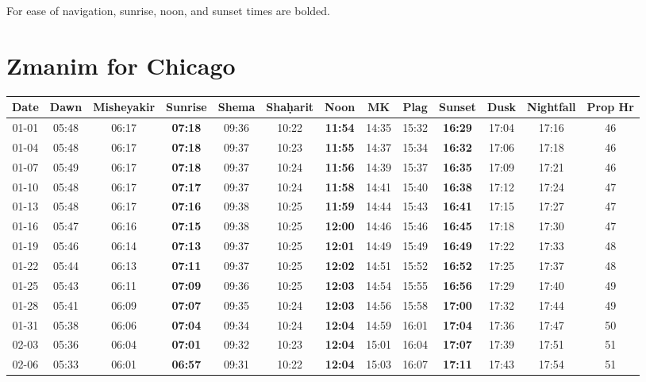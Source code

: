For ease of navigation, sunrise, noon, and sunset times are bolded.

\newpage
\section{Zmanim for Chicago }
\vspace{-0.5\baselineskip}
\begin{footnotesize}
	\begin{longtable}{c | c | c | c | c | c | c | c | c | c | c | c | c}
		Date&Dawn&Misheyakir&Sunrise&Shema&Sha\d{h}arit&Noon&MK&Plag&Sunset&Dusk&Nightfall&Prop Hr\\\hline\endhead
		01-01&05:48&06:17&\textbf{07:18}&09:36&10:22&\textbf{11:54}&14:35&15:32&\textbf{16:29}&17:04&17:16&46\\\hline
		01-04&05:48&06:17&\textbf{07:18}&09:37&10:23&\textbf{11:55}&14:37&15:34&\textbf{16:32}&17:06&17:18&46\\\hline
		01-07&05:49&06:17&\textbf{07:18}&09:37&10:24&\textbf{11:56}&14:39&15:37&\textbf{16:35}&17:09&17:21&46\\\hline
		01-10&05:48&06:17&\textbf{07:17}&09:37&10:24&\textbf{11:58}&14:41&15:40&\textbf{16:38}&17:12&17:24&47\\\hline
		01-13&05:48&06:17&\textbf{07:16}&09:38&10:25&\textbf{11:59}&14:44&15:43&\textbf{16:41}&17:15&17:27&47\\\hline
		01-16&05:47&06:16&\textbf{07:15}&09:38&10:25&\textbf{12:00}&14:46&15:46&\textbf{16:45}&17:18&17:30&47\\\hline
		01-19&05:46&06:14&\textbf{07:13}&09:37&10:25&\textbf{12:01}&14:49&15:49&\textbf{16:49}&17:22&17:33&48\\\hline
		01-22&05:44&06:13&\textbf{07:11}&09:37&10:25&\textbf{12:02}&14:51&15:52&\textbf{16:52}&17:25&17:37&48\\\hline
		01-25&05:43&06:11&\textbf{07:09}&09:36&10:25&\textbf{12:03}&14:54&15:55&\textbf{16:56}&17:29&17:40&49\\\hline
		01-28&05:41&06:09&\textbf{07:07}&09:35&10:24&\textbf{12:03}&14:56&15:58&\textbf{17:00}&17:32&17:44&49\\\hline
		01-31&05:38&06:06&\textbf{07:04}&09:34&10:24&\textbf{12:04}&14:59&16:01&\textbf{17:04}&17:36&17:47&50\\\hline
		02-03&05:36&06:04&\textbf{07:01}&09:32&10:23&\textbf{12:04}&15:01&16:04&\textbf{17:07}&17:39&17:51&51\\\hline
		02-06&05:33&06:01&\textbf{06:57}&09:31&10:22&\textbf{12:04}&15:03&16:07&\textbf{17:11}&17:43&17:54&51\\\hline

\end{longtable}
\end{footnotesize}
